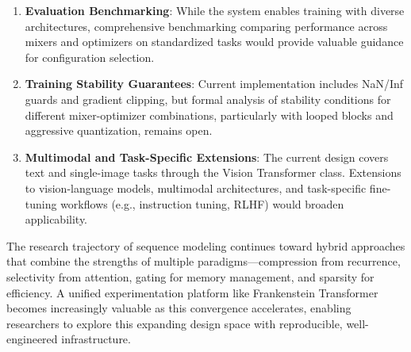 \begin{enumerate}[leftmargin=*]
    \item \textbf{Evaluation Benchmarking}: While the system enables training with diverse architectures, comprehensive benchmarking comparing performance across mixers and optimizers on standardized tasks would provide valuable guidance for configuration selection.
    
    \item \textbf{Training Stability Guarantees}: Current implementation includes NaN/Inf guards and gradient clipping, but formal analysis of stability conditions for different mixer-optimizer combinations, particularly with looped blocks and aggressive quantization, remains open.
    
    \item \textbf{Multimodal and Task-Specific Extensions}: The current design covers text and single-image tasks through the Vision Transformer class. Extensions to vision-language models, multimodal architectures, and task-specific fine-tuning workflows (e.g., instruction tuning, RLHF) would broaden applicability.
\end{enumerate}

The research trajectory of sequence modeling continues toward hybrid approaches that combine the strengths of multiple paradigms---compression from recurrence, selectivity from attention, gating for memory management, and sparsity for efficiency. A unified experimentation platform like Frankenstein Transformer becomes increasingly valuable as this convergence accelerates, enabling researchers to explore this expanding design space with reproducible, well-engineered infrastructure.

